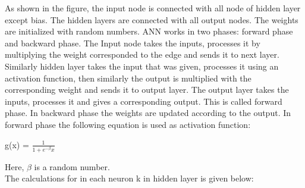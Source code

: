 \documentclass{standalone}
\begin{document}
As shown in the figure, the input node is connected with all node of hidden layer except bias. The hidden layers are connected with all output nodes. The weights are initialized with random numbers. 
ANN works in two phases: forward phase and backward phase. The Input node takes the inputs, processes it by multiplying the weight corresponded to the edge and sends it to next layer. Similarly hidden layer takes the input that was given, processes it using an activation function, then similarly the output is multiplied with the corresponding weight and sends it to output layer. The output layer takes the inputs, processes it and gives a corresponding output. This is called forward phase. In backward phase the weights are updated according to the output. In forward phase the following equation is used as activation function: \\

\begin{center}
	\makebox g(x) = $ \frac {1}{1+e^{-\beta}x} $\\
\end{center}


Here, $ \beta $  is a random number.\\
The calculations for in each neuron k in hidden layer is given below: \\
 
\end{document}
